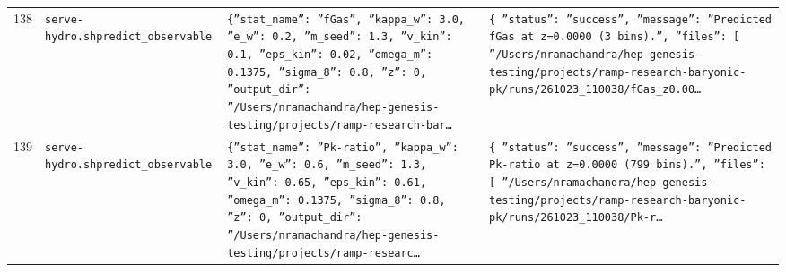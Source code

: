 \documentclass[11pt,a4paper]{article}
\begin{document}
\begin{longtable}{@{}p{}p{}p{}p{}@{}}
138 & \texttt{serve-hydro.sh}\newline\texttt{predict\_\allowbreak{}observable} & \texttt{\{''stat\_\allowbreak{}name'':\allowbreak{} ''fGas'',\allowbreak{} ''kappa\_\allowbreak{}w'':\allowbreak{} 3.0,\allowbreak{} ''e\_\allowbreak{}w'':\allowbreak{} 0.2,\allowbreak{} ''m\_\allowbreak{}seed'':\allowbreak{} 1.3,\allowbreak{} ''v\_\allowbreak{}kin'':\allowbreak{} 0.1,\allowbreak{} ''eps\_\allowbreak{}kin'':\allowbreak{} 0.02,\allowbreak{} ''omega\_\allowbreak{}m'':\allowbreak{} 0.1375,\allowbreak{} ''sigma\_\allowbreak{}8'':\allowbreak{} 0.8,\allowbreak{} ''z'':\allowbreak{} 0,\allowbreak{} ''output\_\allowbreak{}dir'':\allowbreak{} ''/\allowbreak{}Users/\allowbreak{}nramachandra/\allowbreak{}hep-genesis-testing/\allowbreak{}projects/\allowbreak{}ramp-research-bar\ldots{}\allowbreak{}} & \texttt{\{   ''status'':\allowbreak{} ''success'',\allowbreak{}   ''message'':\allowbreak{} ''Predicted fGas at z=\allowbreak{}0.0000 (3 bins)\allowbreak{}.'',\allowbreak{}   ''files'':\allowbreak{} [     ''/\allowbreak{}Users/\allowbreak{}nramachandra/\allowbreak{}hep-genesis-testing/\allowbreak{}projects/\allowbreak{}ramp-research-baryonic-pk/\allowbreak{}runs/\allowbreak{}261023\_\allowbreak{}110038/\allowbreak{}fGas\_\allowbreak{}z0.00\ldots{}\allowbreak{}} \\
139 & \texttt{serve-hydro.sh}\newline\texttt{predict\_\allowbreak{}observable} & \texttt{\{''stat\_\allowbreak{}name'':\allowbreak{} ''Pk-ratio'',\allowbreak{} ''kappa\_\allowbreak{}w'':\allowbreak{} 3.0,\allowbreak{} ''e\_\allowbreak{}w'':\allowbreak{} 0.6,\allowbreak{} ''m\_\allowbreak{}seed'':\allowbreak{} 1.3,\allowbreak{} ''v\_\allowbreak{}kin'':\allowbreak{} 0.65,\allowbreak{} ''eps\_\allowbreak{}kin'':\allowbreak{} 0.61,\allowbreak{} ''omega\_\allowbreak{}m'':\allowbreak{} 0.1375,\allowbreak{} ''sigma\_\allowbreak{}8'':\allowbreak{} 0.8,\allowbreak{} ''z'':\allowbreak{} 0,\allowbreak{} ''output\_\allowbreak{}dir'':\allowbreak{} ''/\allowbreak{}Users/\allowbreak{}nramachandra/\allowbreak{}hep-genesis-testing/\allowbreak{}projects/\allowbreak{}ramp-researc\ldots{}\allowbreak{}} & \texttt{\{   ''status'':\allowbreak{} ''success'',\allowbreak{}   ''message'':\allowbreak{} ''Predicted Pk-ratio at z=\allowbreak{}0.0000 (799 bins)\allowbreak{}.'',\allowbreak{}   ''files'':\allowbreak{} [     ''/\allowbreak{}Users/\allowbreak{}nramachandra/\allowbreak{}hep-genesis-testing/\allowbreak{}projects/\allowbreak{}ramp-research-baryonic-pk/\allowbreak{}runs/\allowbreak{}261023\_\allowbreak{}110038/\allowbreak{}Pk-r\ldots{}\allowbreak{}} \\

\end{longtable}
\end{document}
